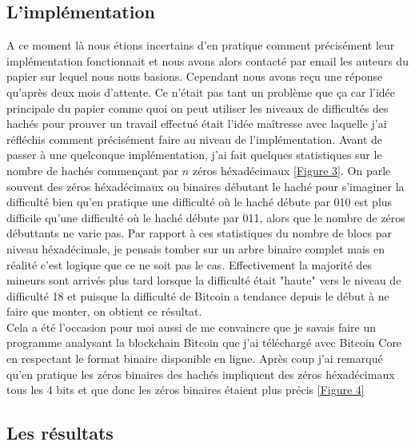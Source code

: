 \documentclass[12pt,a4paper]{article}
\newcommand{\annexe}[2]{\hyperlink{#1}{[Figure #2]}}
\begin{document}
	\subsection{L'implémentation} %
	
	A ce moment là nous étions incertains d'en pratique comment précisément leur implémentation fonctionnait et nous avons alors contacté par email les auteurs du papier sur lequel nous nous basions. Cependant nous avons reçu une réponse qu'après deux mois d'attente. Ce n'était pas tant un problème que ça car l'idée principale du papier comme quoi on peut utiliser les niveaux de difficultés des hachés pour prouver un travail effectué était l'idée maîtresse avec laquelle j'ai réfléchis comment précisément faire au niveau de l'implémentation. Avant de passer à une quelconque implémentation, j'ai fait quelques statistiques sur le nombre de hachés commençant par $n$ zéros héxadécimaux \annexe{23}{3}. On parle souvent des zéros héxadécimaux ou binaires débutant le haché pour s'imaginer la difficulté bien qu'en pratique une difficulté où le haché débute par 010 est plus difficile qu'une difficulté où le haché débute par 011, alors que le nombre de zéros débuttants ne varie pas. Par rapport à ces statistiques du nombre de blocs par niveau héxadécimale, je pensais tomber sur un arbre binaire complet mais en réalité c'est logique que ce ne soit pas le cas. Effectivement la majorité des mineurs sont arrivés plus tard lorsque la difficulté était "haute" vers le niveau de difficulté 18 et puisque la difficulté de Bitcoin a tendance depuis le début à ne faire que monter, on obtient ce résultat.\\
Cela a été l'occasion pour moi aussi de me convaincre que je savais faire un programme analysant la blockchain Bitcoin que j'ai téléchargé avec Bitcoin Core en respectant le format binaire disponible en ligne. Après coup j'ai remarqué qu'en pratique les zéros binaires des hachés impliquent des zéros héxadécimaux tous les 4 bits et que donc les zéros binaires étaient plus précis \annexe{24}{4} %
	
	
	
	\subsection{Les résultats}
	
\end{document}
